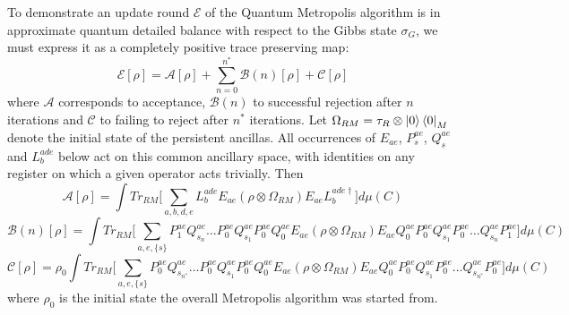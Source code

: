 \documentclass[aps,floatfix,10pt,amssymb,amsfont,amsmath,superscriptaddress,float,nofootinbib,longbibliography,nobalancelastpage,twocolumn]{revtex4-2}
\begin{document}
\begin{widetext}
To demonstrate an update round $\mathcal{E}$ of the Quantum Metropolis algorithm is in approximate quantum detailed balance with respect to the Gibbs state $\sigma_G$, we must express it as a completely positive trace preserving map:
\begin{equation}
    \mathcal{E}[\rho] = \mathcal{A}[\rho] + \sum_{n=0}^{n^*} \mathcal{B}(n)[\rho] + \mathcal{C}[\rho]
\end{equation}
where $\mathcal{A}$ corresponds to acceptance, $\mathcal{B}(n)$ to successful rejection after $n$ iterations and $\mathcal{C}$ to failing to reject after $n^*$ iterations. Let $\Omega_{RM}=\tau_R\otimes\ket{0}\bra{0}_M$ denote the initial state of the persistent ancillas. All occurrences of $E_{ae}$, $P_s^{ae}$, $Q_s^{ae}$ and $L_b^{ade}$ below act on this common ancillary space, with identities on any register on which a given operator acts trivially. Then
\begin{equation}
    \mathcal{A}[\rho] = \int  Tr_{RM}\bigg[\sum_{a,b,d,e}L_b^{ade} E_{ae} ( \rho\otimes \Omega_{RM}) 
     E_{ae}L^{ade\dagger}_b\bigg]d\mu(C)
\end{equation}
\begin{equation}
    \mathcal{B}(n)[\rho] = \int Tr_{RM}\bigg[\sum_{a,e,\{s\}}P^{ae}_1Q^{ae}_{s_n}\ldots P^{ae}_0Q^{ae}_{s_1}P^{ae}_0Q^{ae}_0E_{ae} ( \rho\otimes \Omega_{RM})E_{ae}Q^{ae}_0P^{ae}_0Q^{ae}_{s_1}P^{ae}_0\ldots Q^{ae}_{s_n}P^{ae}_1\bigg]d\mu(C)
\end{equation}
\begin{equation}
    \mathcal{C}[\rho] = \rho_0 \int Tr_{RM}\bigg[\sum_{a,e,\{s\}}P^{ae}_0Q^{ae}_{s_{n^*}}\ldots P^{ae}_0Q^{ae}_{s_1}P^{ae}_0Q^{ae}_0E_{ae} ( \rho\otimes \Omega_{RM})E_{ae}Q^{ae}_0P^{ae}_0Q^{ae}_{s_1}P^{ae}_0\ldots Q^{ae}_{s_{n^*}}P^{ae}_0\bigg]d\mu(C) 
\end{equation}
where $\rho_0$ is the initial state the overall Metropolis algorithm was started from. 



\end{widetext}
\end{document}
